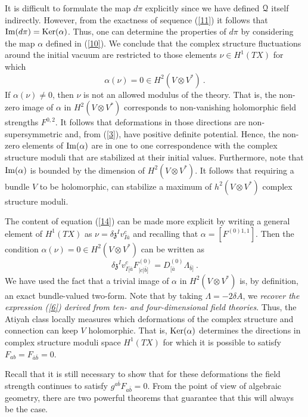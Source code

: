 \documentclass[12pt]{article}
\numberwithin{equation}{section}
\begin{document}
It is difficult to formulate the map $d\pi$ explicitly since we have defined ${\cal Q}$ itself indirectly. However, from the exactness of sequence (\ref{11}) it follows that ${\rm Im}(d\pi)={\rm Ker}(\alpha)$. Thus, one can determine the properties of $d\pi$ by considering the map $\alpha$ defined in (\ref{10}). We conclude that the complex structure fluctuations around the initial vacuum are restricted to those elements $\nu \in H^1(TX)$ for which
\begin{equation}
\alpha(\nu)=0 \in H^2(V\otimes V^*) \ .
\label{14}
\end{equation}
If $\alpha(\nu) \neq 0$, then $\nu$ is not an allowed modulus of the theory. That is, the non-zero image of $\alpha$ in $H^2(V\otimes V^*)$ corresponds to non-vanishing holomorphic field strengths $F^{0,2}$. It follows that deformations in those directions are non-supersymmetric and, from (\ref{3}), have positive definite potential. Hence, the non-zero elements of ${\rm Im}(\alpha)$ are in one to one correspondence with the complex structure moduli that are stabilized at their initial values. Furthermore, note that ${\rm Im}(\alpha)$ is bounded by the dimension of $H^2(V\otimes V^*)$. It follows that requiring a bundle $V$ to be holomorphic, can stabilize a maximum of $h^2(V\otimes V^*)$ complex structure moduli.

The content of equation (\ref{14}) can be made more explicit by writing a general element of $H^{1}(TX)$ as $\nu=\delta {\mathfrak{z}}^{I} v_{I {\bar{a}}}^{c}$ and recalling that $\alpha=[F^{(0)1,1}]$.
Then the condition $\alpha(\nu)=0 \in H^2(V\otimes V^*)$ can be written as
%
\begin{equation}
\delta{\mathfrak z}^{I}v^{c}_{I[{\bar a}}F^{(0)}_{|c|{\bar b}]}=D^{(0)}_{[{\bar a}}\Lambda_{{\bar b}]} \ .
\label{15}
\end{equation}
%
We have used the fact that a trivial image of $\alpha$ in $H^2(V\otimes V^*)$ is, by definition, an exact bundle-valued two-form. Note that by taking $\Lambda=-2\delta A$, we {\it recover the expression (\ref{6}) derived from ten- and four-dimensional field theories}. Thus, the Atiyah class locally measures which deformations of the complex structure and connection can keep $V$ holomorphic. That is, ${\rm Ker} (\alpha)$ determines the directions in complex structure moduli space $H^{1}(TX)$ for which it is possible to satisfy $F_{ab}=F_{{\bar a}{\bar b}}=0$.

Recall that it is still necessary to show that for these deformations the field strength continues to satisfy 
$g^{a{\bar{b}}} F_{a{\bar{b}}} =0 $.
From the point of view of algebraic geometry, there are two powerful theorems that guarantee that this will always be the case. 
\end{document}
